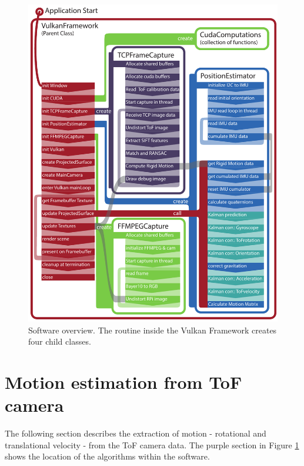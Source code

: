 \begin{figure}[H]
    \centering
    \includegraphics[width=1.0\textwidth]{images/SoftwareArchitecture.pdf}
    \caption{Software overview. The routine inside the Vulkan Framework creates four child classes.}
    \label{fig:sw_concept}
\end{figure}

\section{Motion estimation from ToF camera}
The following section describes the extraction of motion - rotational and translational velocity - from the ToF camera data. The purple section in Figure \ref{fig:sw_concept} shows the location of the algorithms within the software.
